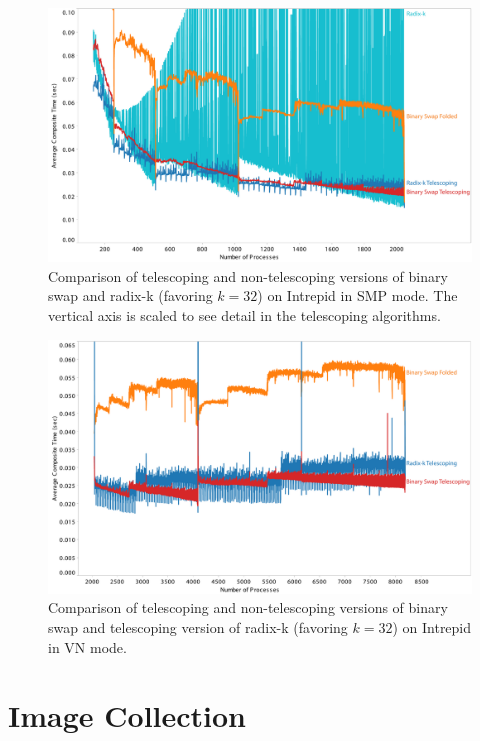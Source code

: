 \documentclass{vgtc}                          %
\begin{document}
\begin{figure}[htbp]
  \centering
  \includegraphics[width=\linewidth]{images/TelescopeCompositeIntrepidSMPZoomed}
  \caption{Comparison of telescoping and non-telescoping versions of binary
    swap and radix-k (favoring $k=32$) on Intrepid in SMP mode.  The
    vertical axis is scaled to see detail in the telescoping algorithms.}
  \label{fig:TelescopeCompositeIntrepidSMPZoomed}
\end{figure}

\begin{figure}[htbp]
  \centering
  \includegraphics[width=\linewidth]{images/TelescopeCompositeIntrepidVN}
  \caption{Comparison of telescoping and non-telescoping versions of binary
    swap and telescoping version of radix-k (favoring $k=32$) on Intrepid
    in VN mode.}
  \label{fig:TelescopeCompositeIntrepidVN}
\end{figure}

\section{Image Collection}
\label{sec:ImageCollection}
\end{document}
